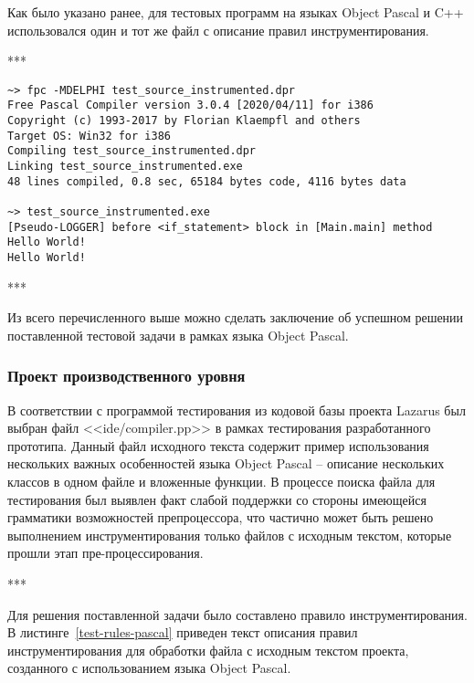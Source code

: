Как было указано ранее, для тестовых программ на языках Object Pascal и C++ использовался один и тот же файл с описание правил инструментирования.

***

\begin{lstlisting}[frame=single, label={test-pascal-run}, caption={Результаты сборки и запуска обработанного тестового приложения.}]
~> fpc -MDELPHI test_source_instrumented.dpr
Free Pascal Compiler version 3.0.4 [2020/04/11] for i386
Copyright (c) 1993-2017 by Florian Klaempfl and others
Target OS: Win32 for i386
Compiling test_source_instrumented.dpr
Linking test_source_instrumented.exe
48 lines compiled, 0.8 sec, 65184 bytes code, 4116 bytes data

~> test_source_instrumented.exe
[Pseudo-LOGGER] before <if_statement> block in [Main.main] method
Hello World!
Hello World!
\end{lstlisting}

***

Из всего перечисленного выше можно сделать заключение об успешном решении поставленной тестовой задачи в рамках языка Object Pascal.

\subsubsection{Проект производственного уровня}

В соответствии с программой тестирования из кодовой базы проекта Lazarus был выбран файл <<ide/compiler.pp>> в рамках тестирования разработанного прототипа.
Данный файл исходного текста содержит пример использования нескольких важных особенностей языка Object Pascal -- описание нескольких классов в одном файле и вложенные функции.
В процессе поиска файла для тестирования был выявлен факт слабой поддержки со стороны имеющейся грамматики возможностей препроцессора, что частично может быть решено выполнением инструментирования только файлов с исходным текстом, которые прошли этап пре-процессирования.

***

Для решения поставленной задачи было составлено правило инструментирования.
В листинге~\ref{test-rules-pascal} приведен текст описания правил инструментирования для обработки файла с исходным текстом проекта, созданного с использованием языка Object Pascal.

